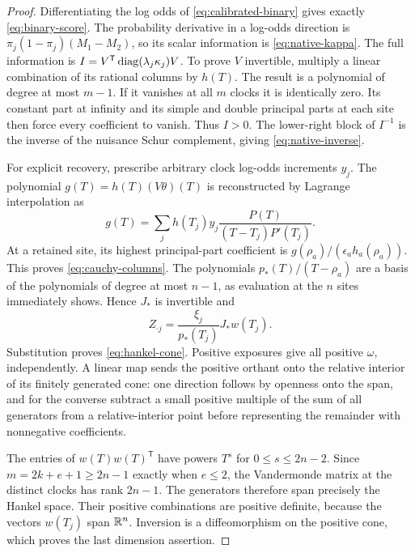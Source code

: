 \begin{proof}
Differentiating the log odds of \eqref{eq:calibrated-binary} gives exactly
\eqref{eq:binary-score}. The probability derivative in a log-odds direction
is $\pi_j(1-\pi_j)(M_1-M_2)$, so its scalar information is
\eqref{eq:native-kappa}. The full information is
$I=V^{\mathsf T}\operatorname{diag}(\lambda_j\kappa_j)V$.
To prove $V$ invertible, multiply a linear combination of its rational
columns by $h(T)$. The result is a polynomial of degree at most $m-1$.
If it vanishes at all $m$ clocks it is identically zero. Its constant
part at infinity and its simple and double principal parts at each site
then force every coefficient to vanish. Thus $I>0$. The lower-right
block of $I^{-1}$ is the inverse of the nuisance Schur complement, giving
\eqref{eq:native-inverse}.

For explicit recovery, prescribe arbitrary clock log-odds increments $y_j$.
The polynomial $g(T)=h(T)(V\theta)(T)$ is reconstructed by Lagrange
interpolation as
\[
 g(T)=\sum_j h(T_j)y_j\frac{P(T)}{(T-T_j)P'(T_j)}.
\]
At a retained site, its highest principal-part coefficient is
$g(\rho_a)/(\epsilon_a h_a(\rho_a))$. This proves
\eqref{eq:cauchy-columns}. The polynomials $p_*(T)/(T-\rho_a)$ are a
basis of the polynomials of degree at most $n-1$, as evaluation at the
$n$ sites immediately shows. Hence $J_*$ is invertible and
\[
 Z_{\cdot j}=\frac{\xi_j}{p_*(T_j)}J_*w(T_j).
\]
Substitution proves \eqref{eq:hankel-cone}. Positive exposures give all
positive $\omega$, independently. A linear map sends the positive orthant
onto the relative interior of its finitely generated cone: one direction
follows by openness onto the span, and for the converse subtract a small
positive multiple of the sum of all generators from a relative-interior
point before representing the remainder with nonnegative coefficients.

The entries of $w(T)w(T)^{\mathsf T}$ have powers $T^s$ for
$0\le s\le2n-2$. Since $m=2k+e+1\ge2n-1$ exactly when $e\le2$, the
Vandermonde matrix at the distinct clocks has rank $2n-1$. The generators
therefore span precisely the Hankel space. Their positive combinations
are positive definite, because the vectors $w(T_j)$ span $\mathbb R^n$.
Inversion is a diffeomorphism on the positive cone, which proves the
last dimension assertion.
\end{proof}

